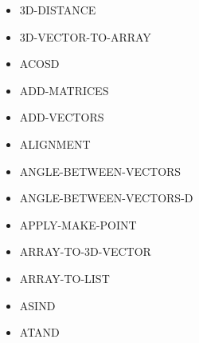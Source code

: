 \documentclass [11pt]{book}
\begin{document}
\begin{itemize}

\item {}3D-DISTANCE





\item {}3D-VECTOR-TO-ARRAY





\item {}ACOSD





\item {}ADD-MATRICES





\item {}ADD-VECTORS





\item {}ALIGNMENT





\item {}ANGLE-BETWEEN-VECTORS





\item {}ANGLE-BETWEEN-VECTORS-D





\item {}APPLY-MAKE-POINT





\item {}ARRAY-TO-3D-VECTOR





\item {}ARRAY-TO-LIST





\item {}ASIND





\item {}ATAND






\end{itemize}
\end{document}
